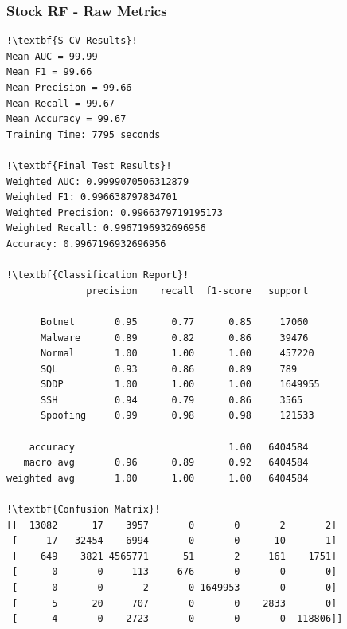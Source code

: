 \begin{appendices}
\subsubsection{Stock RF - Raw Metrics}
\begin{lstlisting}[escapechar=!]
!\textbf{S-CV Results}!
Mean AUC = 99.99
Mean F1 = 99.66
Mean Precision = 99.66
Mean Recall = 99.67
Mean Accuracy = 99.67
Training Time: 7795 seconds

!\textbf{Final Test Results}!
Weighted AUC: 0.9999070506312879
Weighted F1: 0.996638797834701
Weighted Precision: 0.9966379719195173
Weighted Recall: 0.9967196932696956
Accuracy: 0.9967196932696956

!\textbf{Classification Report}!
              precision    recall  f1-score   support

      Botnet       0.95      0.77      0.85     17060
      Malware      0.89      0.82      0.86     39476
      Normal       1.00      1.00      1.00     457220
      SQL          0.93      0.86      0.89     789
      SDDP         1.00      1.00      1.00     1649955
      SSH          0.94      0.79      0.86     3565
      Spoofing     0.99      0.98      0.98     121533

    accuracy                           1.00   6404584
   macro avg       0.96      0.89      0.92   6404584
weighted avg       1.00      1.00      1.00   6404584

!\textbf{Confusion Matrix}!
[[  13082      17    3957       0       0       2       2]
 [     17   32454    6994       0       0      10       1]
 [    649    3821 4565771      51       2     161    1751]
 [      0       0     113     676       0       0       0]
 [      0       0       2       0 1649953       0       0]
 [      5      20     707       0       0    2833       0]
 [      4       0    2723       0       0       0  118806]]
\end{lstlisting}


\end{appendices}
